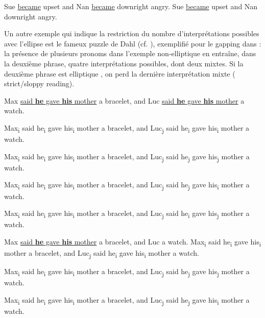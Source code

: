 \ea \label{ch1:ex7}
\ea  Sue \uline{became} upset and Nan \uline{became} downright angry.\label{ch1:ex7a}   
\ex  Sue \uline{became} upset and Nan downright angry.\label{ch1:ex7b}   
\z
\z

Un autre exemple qui indique la restriction du nombre d’interprétations possibles avec l’ellipse est le fameux puzzle de Dahl (cf. \citealt{FiengoEtAl1994}), exemplifié pour le gapping dans \citet{Coppock2001} : la présence de plusieurs pronoms dans l’exemple non-elliptique en  entraîne, dans la deuxième phrase, quatre interprétations possibles, dont deux mixtes. Si la deuxième phrase est elliptique , on perd la dernière interprétation mixte  ({\cad} strict/sloppy reading).   

\ea Max \uline{said \textbf{he} gave \textbf{his} mother} a bracelet, and Luc \uline{said \textbf{he} gave \textbf{his} mother} a watch.\label{ch1:ex8}

\ea  Max\textsubscript{i} said he\textsubscript{i} gave his\textsubscript{i} mother a bracelet, and Luc\textsubscript{j} said he\textsubscript{i} gave his\textsubscript{i} mother a watch. 

\ex  Max\textsubscript{i} said he\textsubscript{i} gave his\textsubscript{i} mother a bracelet, and Luc\textsubscript{j} said he\textsubscript{j} gave his\textsubscript{j} mother a watch.

\ex  Max\textsubscript{i} said he\textsubscript{i} gave his\textsubscript{i} mother a bracelet, and Luc\textsubscript{j} said he\textsubscript{j} gave his\textsubscript{i} mother a watch.

\ex  Max\textsubscript{i} said he\textsubscript{i} gave his\textsubscript{i} mother a bracelet, and Luc\textsubscript{j} said he\textsubscript{i} gave his\textsubscript{j} mother a watch.
\z
\z


\ea Max \uline{said \textbf{he} gave \textbf{his} mother} a bracelet, and Luc a watch.\label{ch1:ex9}
\ea  Max\textsubscript{i} said he\textsubscript{i} gave his\textsubscript{i} mother a bracelet, and Luc\textsubscript{j} said he\textsubscript{i} gave his\textsubscript{i} mother a watch. 

\ex  Max\textsubscript{i} said he\textsubscript{i} gave his\textsubscript{i} mother a bracelet, and Luc\textsubscript{j} said he\textsubscript{j} gave his\textsubscript{j} mother a watch.

\ex  Max\textsubscript{i} said he\textsubscript{i} gave his\textsubscript{i} mother a bracelet, and Luc\textsubscript{j} said he\textsubscript{j} gave his\textsubscript{i} mother a watch.

